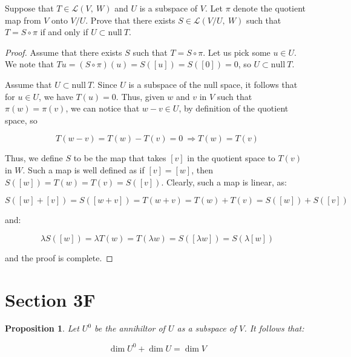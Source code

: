 \documentclass[10pt, oneside]{article}
\newenvironment{problem}[2][Problem]{\begin{trivlist}
\item[\hskip \labelsep {\bfseries #1}\hskip \labelsep {\bfseries #2.}]}{\end{trivlist}}
\newtheorem{prop}{Proposition}
\begin{document}
    \begin{problem}{3.18}

      Suppose that $T \in \mathcal{L}(V, \ W)$ and $U$ is a subspace of $V$. Let $\pi$ denote the quotient map from $V$ onto $V/U$.
      Prove that there exists $S \in \mathcal{L}(V/U, \ W)$ such that $T = S \circ \pi$ if and only if $U \subset \text{null} \ T$.

    \end{problem}

    \begin{proof}

      Assume that there exists $S$ such that $T = S \circ \pi$. Let us pick some $u \in U$. We note that $Tu = (S \circ \pi)(u) = S([u]) = S([0]) = 0$,
      so $U \subset \text{null} \ T$.
      \newline

      Assume that $U \subset \text{null} \ T$. Since $U$ is a subspace of the null space, it follows that for $u \in U$, we have $T(u) = 0$. Thus,
      given $w$ and $v$ in $V$ such that $\pi(w) = \pi(v)$, we can notice that $w - v \in U$, by definition of the quotient space, so

      $$T(w - v) = T(w) - T(v) = 0 \ \Rightarrow T(w) = T(v)$$

      Thus, we define $S$ to be the map that takes $[v]$ in the quotient space to $T(v)$ in $W$. Such a map is well defined as if $[v] = [w]$, then
      $S([w]) = T(w) = T(v) = S([v])$. Clearly, such a map is linear, as:

      $$S([w] + [v]) = S([w + v]) = T(w + v) = T(w) + T(v) = S([w]) + S([v])$$

      and:

      $$\lambda S([w]) = \lambda T(w) = T(\lambda w) = S([\lambda w]) = S(\lambda [w])$$

      and the proof is complete.

    \end{proof}

    \section{Section 3F}

    \begin{prop}
      Let $U^0$ be the annihiltor of $U$ as a subspace of $V$. It follows that:

      $$\dim U^{0} + \dim U = \dim V$$
    \end{prop}
\end{document}
